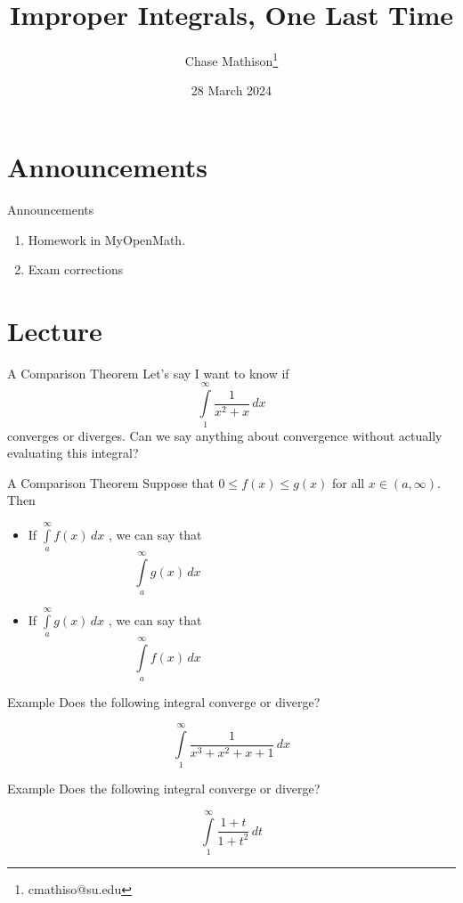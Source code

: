 \documentclass[presentation]{beamer}
\institute[SU]{Shenandoah University}
\author{Chase Mathison\thanks{cmathiso@su.edu}}
\date{28 March 2024}
\title{Improper Integrals, One Last Time}
\begin{document}
\maketitle

\section{Announcements}
\label{sec:orgac7468f}
\begin{frame}[label={sec:orgeb520a0}]{Announcements}
\begin{enumerate}
\item Homework in MyOpenMath.
\item Exam corrections
\end{enumerate}
\end{frame}

\section{Lecture}
\label{sec:org2a84480}
\begin{frame}[label={sec:orgcc72042}]{A Comparison Theorem}
Let's say I want to know if
\[
\int\limits_1^{\infty} \frac{1}{x^2 + x}\,dx\]
converges or diverges.  Can we say anything about convergence without
actually evaluating this integral?

\vspace{10in}
\end{frame}

\begin{frame}[label={sec:org211a2a4}]{A Comparison Theorem}
Suppose that \(0 \le f(x) \le g(x)\) for all \(x \in \left( a,\infty \right)\). Then
\begin{itemize}
\item If
\(\int\limits_a^{\infty} f(x)\,dx\)
\uline{\hspace*{1in}}, we can say that
\[
  \int\limits_a^{\infty} g(x)\,dx \hspace{2in}\]
\item If
\(\int\limits_a^{\infty} g(x)\,dx\)
\uline{\hspace*{1in}}, we can say that
\[
  \int\limits_a^{\infty} f(x)\,dx \hspace{2in}\]
\end{itemize}
\end{frame}

\begin{frame}[label={sec:org8b8b07f}]{Example}
Does the following integral converge or diverge?

\[
\int\limits_1^{\infty} \frac{1}{x^3 + x^2 + x + 1}\,dx\]
\vspace{10in}
\end{frame}

\begin{frame}[label={sec:org2f60137}]{Example}
Does the following integral converge or diverge?

\[
\int\limits_1^{\infty} \frac{1+t}{1+t^2}\,dt\]
\vspace{10in}
\end{frame}
\end{document}
